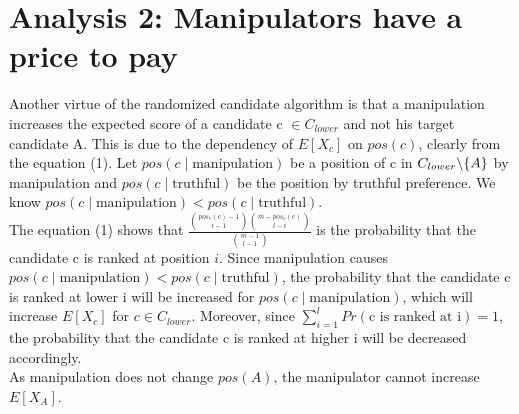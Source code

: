 \documentclass[letterpaper]{article} %
\begin{document}
\section{Analysis 2: Manipulators have a price to pay}
Another virtue of the randomized candidate algorithm is that a manipulation increases the expected score of a candidate c $\in C_{lower}$ and not his target candidate A. This is due to the dependency of $E[X_c]$ on $pos(c)$, clearly from the equation (1). Let $pos(c \mid \text{manipulation})$ be a position of c in $C_{lower} \symbol{92}\text{\{} A\text{\}}$ by manipulation and $pos(c\mid \text{truthful})$ be the position by truthful preference. We know $pos(c \mid \text{manipulation}) < pos(c\mid \text{truthful})$. \\
The equation (1) shows that $ \frac{\binom{pos_v(c)-1}{i-1}\binom{m-pos_v(c)}{l-i}}{\binom{m-1}{l-1}}$ is the probability that the candidate c is ranked at position $i$. Since manipulation causes $pos(c \mid \text{manipulation}) < pos(c\mid \text{truthful})$, the probability that the candidate c is ranked at lower i will be increased for $pos(c \mid \text{manipulation})$, which will increase $E[X_c]$ for $c \in C_{lower}$. Moreover, since $\sum_{i=1}^l Pr(\text{c is ranked at i}) =1$,  the probability that the candidate c is ranked at higher i will be decreased accordingly.\\ As manipulation does not change $pos(A)$, the manipulator cannot increase $E[X_A]$.


\end{document}
